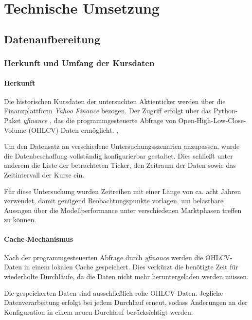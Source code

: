 \section{Technische Umsetzung} \label{hannes}

\subsection{Datenaufbereitung}

\subsubsection{Herkunft und Umfang der Kursdaten}

\paragraph{Herkunft}
Die historischen Kursdaten der untersuchten Aktienticker werden über die Finanzplattform \textit{Yahoo Finance} \cite{yahoo} bezogen. Der Zugriff erfolgt über das Python-Paket \textit{yfinance} \cite{yfinance}, das die programmgesteuerte Abfrage von Open-High-Low-Close-Volume-(OHLCV)-Daten ermöglicht. \cite[S.~351]{mckinney_python_2018}, \cite{ismail_paper}

Um den Datensatz an verschiedene Untersuchungsszenarien anzupassen, wurde die Datenbeschaffung vollständig konfigurierbar gestaltet. Dies schließt unter anderem die Liste der betrachteten Ticker, den Zeitraum der Daten sowie das Zeitintervall der Kurse ein.

Für diese Untersuchung wurden Zeitreihen mit einer Länge von ca. acht Jahren verwendet, damit genügend Beobachtungspunkte vorlagen, um belastbare Aussagen über die Modellperformance unter verschiedenen Marktphasen treffen zu können.

\paragraph{Cache-Mechanismus}
Nach der programmgesteuerten Abfrage durch \textit{yfinance} werden die OHLCV-Daten in einem lokalen Cache gespeichert. Dies verkürzt die benötigte Zeit für wiederholte Durchläufe, da die Daten nicht mehr heruntergeladen werden müssen.

Die gespeicherten Daten sind ausschließlich rohe OHLCV-Daten. Jegliche Datenverarbeitung erfolgt bei jedem Durchlauf erneut, sodass Änderungen an der Konfiguration in einem neuen Durchlauf berücksichtigt werden.

